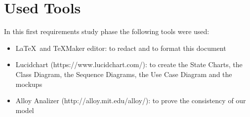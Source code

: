 \chapter{Used Tools} \label{chap7}
In this first requirements study phase the following tools were used:

\begin{itemize}
	\item \LaTeX\ and TeXMaker editor: to redact and to format this document
	\item Lucidchart (https://www.lucidchart.com/): to create the State Charts, the Class Diagram, the Sequence Diagrams, the Use Case Diagram and the mockups
	\item Alloy Analizer (http://alloy.mit.edu/alloy/): to prove the consistency of our model
\end{itemize}